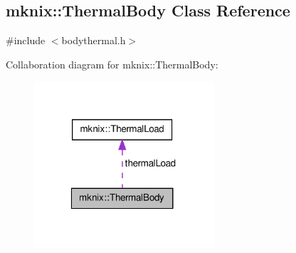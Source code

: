 \hypertarget{classmknix_1_1_thermal_body}{\subsection{mknix\-:\-:Thermal\-Body Class Reference}
\label{classmknix_1_1_thermal_body}
}


{\ttfamily \#include $<$bodythermal.\-h$>$}



Collaboration diagram for mknix\-:\-:Thermal\-Body\-:\nopagebreak
\begin{figure}[H]
\begin{center}
\leavevmode
\includegraphics[width=190pt]{d5/d1e/classmknix_1_1_thermal_body__coll__graph}
\end{center}
\end{figure}

